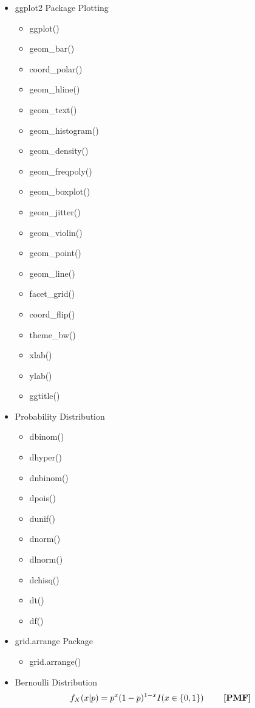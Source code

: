 \documentclass{article}
\begin{document}
\begin{multicols}{2}
\begin{itemize}
  \item ggplot2 Package Plotting
  \begin{itemize}
    \item ggplot()
    \item geom\_bar()
    \item coord\_polar()
    \item geom\_hline()
    \item geom\_text()
    \item geom\_histogram()
    \item geom\_density()
    \item geom\_freqpoly()
    \item geom\_boxplot()
    \item geom\_jitter()
    \item geom\_violin()
    \item geom\_point()
    \item geom\_line()
    \item facet\_grid()
    \item coord\_flip()
    \item theme\_bw()
    \item xlab()
    \item ylab()
    \item ggtitle()
  \end{itemize}
  \item Probability Distribution
  \begin{itemize}
    \item dbinom()
    \item dhyper()
    \item dnbinom()
    \item dpois()
    \item dunif()
    \item dnorm()
    \item dlnorm()
    \item dchisq()
    \item dt()
    \item df()
  \end{itemize}
  \item grid.arrange Package
  \begin{itemize}
  \item grid.arrange()
  \end{itemize}
  \newpage
  \item Bernoulli Distribution
  \begin{align*}
  	f_X(x|p) &= p^x(1-p)^{1-x} I(x \in \{0,1\}) \tag*{ \textbf{[PMF]}}\\

\end{align*}
\end{itemize}
\end{multicols}
\end{document}
